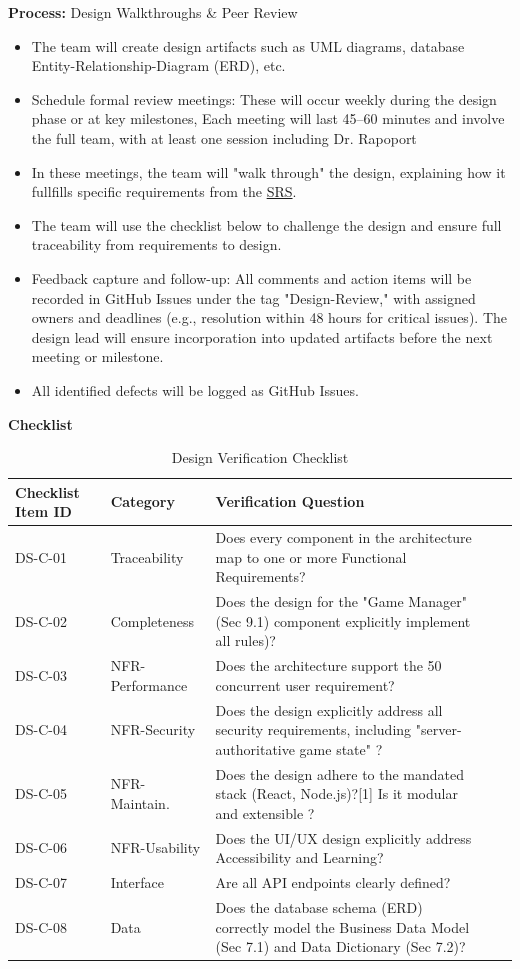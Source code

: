 \documentclass[12pt, titlepage]{article}
\begin{document}
\noindent \textbf{Process:} Design Walkthroughs \& Peer Review
\begin{itemize}
	\item The team will create design artifacts such as UML diagrams, database Entity-Relationship-Diagram (ERD), etc.
	\item Schedule formal review meetings: These will occur weekly during the design phase or at key milestones, Each meeting will last 45–60 minutes and involve the full team, with at least one session including Dr. Rapoport
	\item In these meetings, the team will "walk through" the design, explaining how it fullfills specific requirements from the \href{../SRS/SRS.pdf}{SRS}.
	\item The team will use the checklist below to challenge the design and ensure full traceability from requirements to design.
	\item Feedback capture and follow-up: All comments and action items will be recorded in GitHub Issues under the tag "Design-Review," with assigned owners and deadlines (e.g., resolution within 48 hours for critical issues). The design lead will ensure incorporation into updated artifacts before the next meeting or milestone.
	\item All identified defects will be logged as GitHub Issues.
\end{itemize}

\noindent \textbf{Checklist}
\begin{table}[H]
\centering
\caption{Design Verification Checklist}
\label{tab:design-checklist}
\begin{tabular}{|l|l|p{}|l|l|}
\hline
\textbf{Checklist Item ID} & \textbf{Category} & \textbf{Verification Question}  \\ \hline
DS-C-01 & Traceability & Does every component in the architecture map to one or more Functional Requirements? \\ \hline
DS-C-02 & Completeness & Does the design for the "Game Manager" (Sec 9.1) component explicitly implement all rules)? \\ \hline
DS-C-03 & NFR-Performance & Does the architecture support the 50 concurrent user requirement? \\ \hline
DS-C-04 & NFR-Security & Does the design explicitly address all security requirements, including "server-authoritative game state" ?  \\ \hline
DS-C-05 & NFR-Maintain. & Does the design adhere to the mandated stack (React, Node.js)?[1] Is it modular and extensible ?  \\ \hline
DS-C-06 & NFR-Usability & Does the UI/UX design explicitly address Accessibility and Learning?  \\ \hline
DS-C-07 & Interface & Are all API endpoints clearly defined?  \\ \hline
DS-C-08 & Data & Does the database schema (ERD) correctly model the Business Data Model (Sec 7.1) and Data Dictionary (Sec 7.2)? \\ \hline
\end{tabular}
\end{table}
\end{document}
